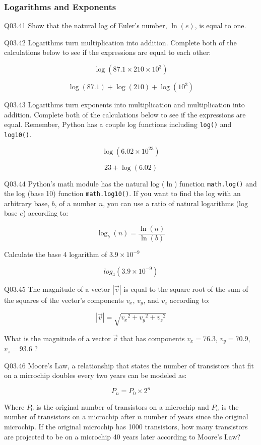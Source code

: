 \documentclass{book}
\newenvironment{problems}{}{}  %
\newcommand{\passthrough}[1]{#1}
\begin{document}
    




    
        \begin{problems}
        \hypertarget{logarithms-and-exponents}{%
\subsubsection{Logarithms and
Exponents}\label{logarithms-and-exponents}}

Q03.41 Show that the natural log of Euler's number, \(\ln(e)\), is equal
to one.

Q03.42 Logarithms turn multiplication into addition. Complete both of
the calculations below to see if the expressions are equal to each
other:

\[ \log(87.1 \times 210 \times 10^{3}) \]

\[ \log(87.1) + \log(210) + \log(10^{3}) \]

Q03.43 Logarithms turn exponents into multiplication and multiplication
into addition. Complete both of the calculations below to see if the
expressions are equal. Remember, Python has a couple log functions
including \passthrough{\lstinline!log()!} and
\passthrough{\lstinline!log10()!}.

\[ \log(6.02 \times 10^{23}) \]

\[ 23+\log(6.02) \]

Q03.44 Python's math module has the natural log (\(\ln\)) function
\passthrough{\lstinline!math.log()!} and the log (base 10) function
\passthrough{\lstinline!math.log10()!}. If you want to find the log with
an arbitrary base, \(b\), of a number \(n\), you can use a ratio of
natural logarithms (log base \(e\)) according to:

\[ \log_b(n) = \frac{\ln(n)}{\ln(b)} \]

Calculate the base 4 logarithm of \(3.9 \times 10^{-9}\)

\[ log_{4}(3.9 \times 10^{-9}) \]

Q03.45 The magnitude of a vector \(|\vec{v}|\) is equal to the square
root of the sum of the squares of the vector's components \(v_x\),
\(v_y\), and \(v_z\) according to:

\[ |\vec{v}| = \sqrt{{v_x}^2 + {v_y}^2 + {v_z}^2} \]

What is the magnitude of a vector \(\vec{v}\) that has components
\(v_x = 76.3\), \(v_y = 70.9\), \(v_z = 93.6\) ?

Q03.46 Moore's Law, a relationship that states the number of transistors
that fit on a microchip doubles every two years can be modeled as:

\[ P_n = P_0 \times 2^n \]

Where \(P_0\) is the original number of transistors on a microchip and
\(P_n\) is the number of transistors on a microchip after \(n\) number
of years since the original microchip. If the original microchip has
1000 transistors, how many transistors are projected to be on a
microchip 40 years later according to Moore's Law?
        \end{problems}
\end{document}
